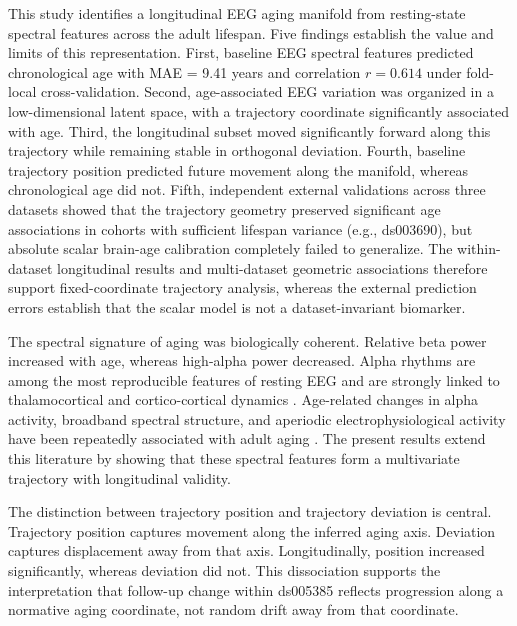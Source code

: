 \documentclass[journal]{IEEEtran}
\begin{document}
This study identifies a longitudinal EEG aging manifold from resting-state spectral features across the adult lifespan. Five findings establish the value and limits of this representation. First, baseline EEG spectral features predicted chronological age with MAE = 9.41 years and correlation $r=0.614$ under fold-local cross-validation. Second, age-associated EEG variation was organized in a low-dimensional latent space, with a trajectory coordinate significantly associated with age. Third, the longitudinal subset moved significantly forward along this trajectory while remaining stable in orthogonal deviation. Fourth, baseline trajectory position predicted future movement along the manifold, whereas chronological age did not. Fifth, independent external validations across three datasets showed that the trajectory geometry preserved significant age associations in cohorts with sufficient lifespan variance (e.g., ds003690), but absolute scalar brain-age calibration completely failed to generalize. The within-dataset longitudinal results and multi-dataset geometric associations therefore support fixed-coordinate trajectory analysis, whereas the external prediction errors establish that the scalar model is not a dataset-invariant biomarker.

The spectral signature of aging was biologically coherent. Relative beta power increased with age, whereas high-alpha power decreased. Alpha rhythms are among the most reproducible features of resting EEG and are strongly linked to thalamocortical and cortico-cortical dynamics \cite{klimesch1999eeg,haegens2014alpha,mierau2017state,nunez2006electric}. Age-related changes in alpha activity, broadband spectral structure, and aperiodic electrophysiological activity have been repeatedly associated with adult aging \cite{dustman1993eeg,voytek2015age,donoghue2020parameterizing,gao2017inferring,he2010temporal}. The present results extend this literature by showing that these spectral features form a multivariate trajectory with longitudinal validity.

The distinction between trajectory position and trajectory deviation is central. Trajectory position captures movement along the inferred aging axis. Deviation captures displacement away from that axis. Longitudinally, position increased significantly, whereas deviation did not. This dissociation supports the interpretation that follow-up change within ds005385 reflects progression along a normative aging coordinate, not random drift away from that coordinate. 
\end{document}
